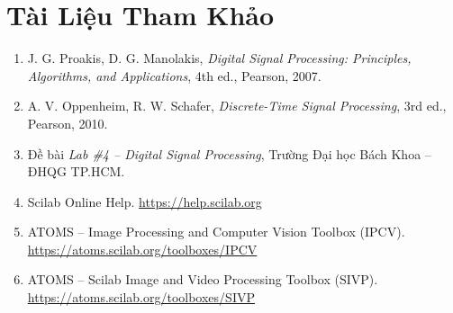 \section{Tài Liệu Tham Khảo}
\begin{enumerate}
    \renewcommand{\labelenumi}{[\theenumi]}
    \item J. G. Proakis, D. G. Manolakis, \textit{Digital Signal Processing: Principles, Algorithms, and Applications}, 4th ed., Pearson, 2007.
    \item A. V. Oppenheim, R. W. Schafer, \textit{Discrete-Time Signal Processing}, 3rd ed., Pearson, 2010.
    \item Đề bài \textit{Lab \#4 -- Digital Signal Processing}, Trường Đại học Bách Khoa -- ĐHQG TP.HCM.
    \item Scilab Online Help. \url{https://help.scilab.org}
    \item ATOMS -- Image Processing and Computer Vision Toolbox (IPCV). \url{https://atoms.scilab.org/toolboxes/IPCV}
    \item ATOMS -- Scilab Image and Video Processing Toolbox (SIVP). \url{https://atoms.scilab.org/toolboxes/SIVP}
\end{enumerate}
